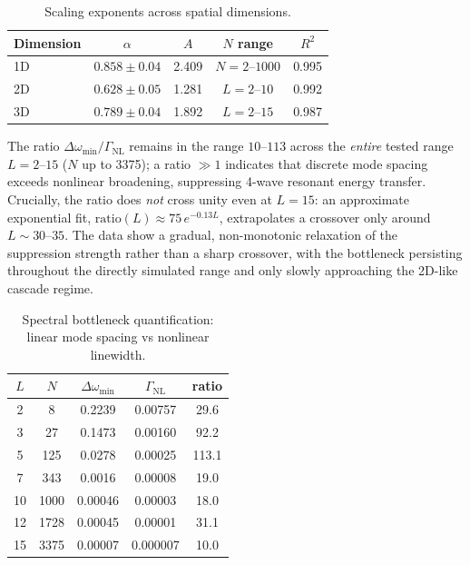 \documentclass[aps,pre,12pt]{revtex4-2}
\begin{document}
\begin{table}[htbp]
\centering
\caption{Scaling exponents across spatial dimensions.}
\label{tab:alpha}
\begin{tabular}{lcccc}
\toprule
Dimension & $\alpha$ & $A$ & $N$ range & $R^2$ \\
\midrule
1D & $0.858\pm0.04$ & 2.409 & $N=2$--$1000$ & 0.995 \\
2D & $0.628\pm0.05$ & 1.281 & $L=2$--$10$ & 0.992 \\
3D & $0.789\pm0.04$ & 1.892 & $L=2$--$15$ & 0.987 \\
\bottomrule
\end{tabular}
\end{table}

The ratio $\Delta\omega_{\min}/\Gamma_{\text{NL}}$ remains in the range $10$--$113$ across the \emph{entire} tested range $L=2$--$15$ ($N$ up to 3375); a ratio $\gg1$ indicates that discrete mode spacing exceeds nonlinear broadening, suppressing 4-wave resonant energy transfer. Crucially, the ratio does \emph{not} cross unity even at $L=15$: an approximate exponential fit, $\text{ratio}(L)\approx75\,e^{-0.13L}$, extrapolates a crossover only around $L\sim30$--$35$. The data show a gradual, non-monotonic relaxation of the suppression strength rather than a sharp crossover, with the bottleneck persisting throughout the directly simulated range and only slowly approaching the 2D-like cascade regime.

\begin{table}[htbp]
\centering
\caption{Spectral bottleneck quantification: linear mode spacing vs nonlinear linewidth.}
\label{tab:bottleneck}
\begin{tabular}{ccccc}
\toprule
$L$ & $N$ & $\Delta\omega_{\min}$ & $\Gamma_{\text{NL}}$ & ratio \\
\midrule
2  & 8    & 0.2239 & 0.00757 & 29.6 \\
3  & 27   & 0.1473 & 0.00160 & 92.2 \\
5  & 125  & 0.0278 & 0.00025 & 113.1 \\
7  & 343  & 0.0016 & 0.00008 & 19.0 \\
10 & 1000 & 0.00046& 0.00003 & 18.0 \\
12 & 1728 & 0.00045& 0.00001 & 31.1 \\
15 & 3375 & 0.00007& 0.000007& 10.0 \\
\bottomrule
\end{tabular}
\end{table}
\end{document}
